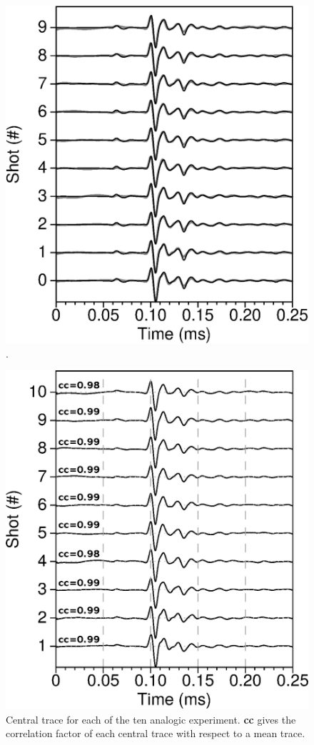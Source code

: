 \documentclass[manuscript,revised]{geophysics}
\begin{document}
\begin{figure}[!h]
	\centering
	\includegraphics[scale=1.0]{fig/F50_CT_once.eps}
	\caption{.}
	\label{panel_srcest_2d_comp}
\end{figure}

\begin{figure}[!h]
	\centering
	\includegraphics[scale=1.0]{fig/musc_F50_CT.eps}
	\caption{Central trace for each of the ten analogic experiment. \textbf{cc} gives the correlation factor of each central trace with respect to a mean trace.}
	\label{panel_srcest_2d_mean}
\end{figure}
\end{document}
